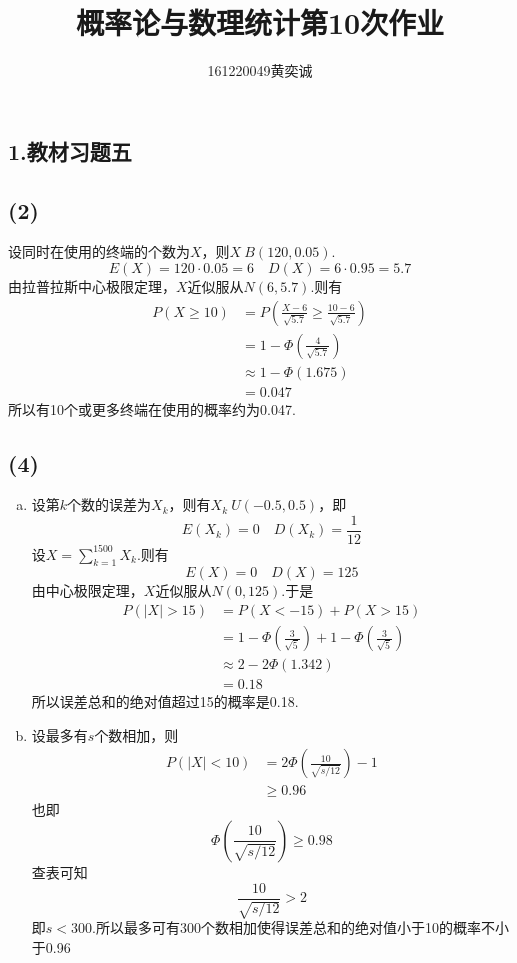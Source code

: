 \documentclass[twocolumn]{article}
\begin{document}
	\begin{CJK}{UTF8}{gbsn}		
			\title{概率论与数理统计第10次作业}
			\author{161220049\quad 黄奕诚}
			\maketitle
			
			\section*{1.教材习题五}
			\subsection*{(2)}
				设同时在使用的终端的个数为$X$，则$X~B(120,0.05)$.\[E(X)=120\cdot0.05=6\quad D(X) = 6\cdot0.95=5.7\]
				由拉普拉斯中心极限定理，$X$近似服从$N(6,5.7)$.则有\begin{align*}
					P(X\ge10) & = P(\frac{X-6}{\sqrt{5.7}}\ge\frac{10-6}{\sqrt{5.7}})\\
					& = 1-\Phi(\frac{4}{\sqrt{5.7}})\\
					& \approx 1-\Phi(1.675)\\
					& = 0.047
				\end{align*}
				所以有10个或更多终端在使用的概率约为0.047.
			\subsection*{(4)}
				\begin{enumerate}[(a)]
					\item 设第$k$个数的误差为$X_k$，则有$X_k~U(-0.5,0.5)$，即\[E(X_k)=0\quad D(X_k)=\frac{1}{12}\]设$X=\sum_{k=1}^{1500}X_k$.则有\[E(X)=0\quad D(X)=125\]由中心极限定理，$X$近似服从$N(0,125)$.于是\begin{align*}
						P(|X|>15) & = P(X<-15) + P(X>15)\\
						& = 1-\Phi(\frac{3}{\sqrt{5}})+1-\Phi(\frac{3}{\sqrt{5}})\\
						& \approx 2-2\Phi(1.342)\\
						& = 0.18
					\end{align*}
					所以误差总和的绝对值超过15的概率是0.18.
					\item 设最多有$s$个数相加，则\begin{align*}
						P(|X|<10) & = 2\Phi(\frac{10}{\sqrt{s/12}}) -1\\
						& \ge0.96
					\end{align*}
					也即\[\Phi(\frac{10}{\sqrt{s/12}})\ge0.98\]
					查表可知\[\frac{10}{\sqrt{s/12}}>2\]
					即$s<300$.所以最多可有300个数相加使得误差总和的绝对值小于10的概率不小于0.96
				\end{enumerate}
			

\end{CJK}
\end{document}
